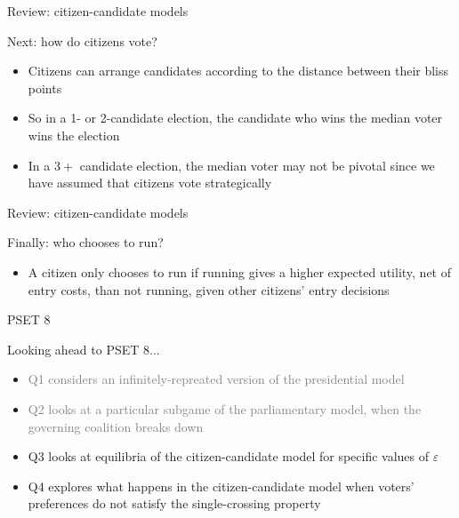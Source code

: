\documentclass[11pt,aspectratio=169]{beamer}
\begin{document}
  \begin{frame}{Review: citizen-candidate models}
  
  Next: how do citizens vote? \\
  
  \pause

  
  \begin{itemize}
  \item Citizens can arrange candidates according to the distance between their bliss points
  \item So in a 1- or 2-candidate election, the candidate who wins the median voter wins the election
  \item In a $3+$ candidate election, the median voter may not be pivotal since we have assumed that citizens vote strategically
  \end{itemize}
 
 
 \end{frame}
 
  \begin{frame}{Review: citizen-candidate models}

Finally: who chooses to run?

\pause


\begin{itemize}
\item A citizen only chooses to run if running gives a higher expected utility, net of entry costs, than not running, given other citizens' entry decisions
\end{itemize}

\end{frame}

 \begin{frame}{PSET 8}
 
 Looking ahead to \alert{PSET 8}...
 
 \begin{itemize}
 \item \textcolor{gray}{Q1 considers an infinitely-repreated version of the presidential model }
 \item \textcolor{gray}{Q2 looks at a particular subgame of the parliamentary model, when the governing coalition breaks down }
 \item Q3 looks at equilibria of the citizen-candidate model for specific values of $\varepsilon$
 \item Q4 explores what happens in the citizen-candidate model when voters' preferences do not satisfy the single-crossing property
 \end{itemize}
 
 \end{frame}
\end{document}
